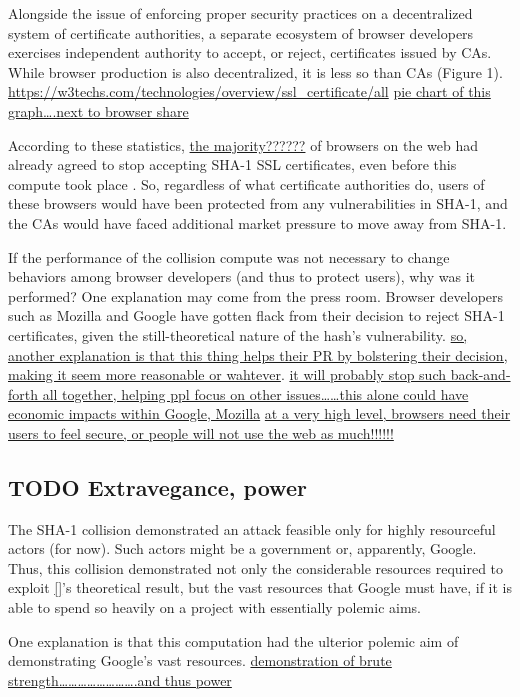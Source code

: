 \documentclass[sigconf]{acmart}
\begin{document}
Alongside the issue of enforcing proper security practices on a decentralized system of certificate authorities, 
a separate ecosystem of browser developers exercises independent authority to accept, or reject, certificates issued by CAs.
While browser production is also decentralized, it is less so than CAs (Figure 1).
\url{https://w3techs.com/technologies/overview/ssl\_certificate/all} \uline{pie chart of this graph\ldots{}.next to browser share}

According to these statistics, \uline{the majority??????} of browsers on the web had already agreed to stop accepting SHA-1 SSL certificates,
even before this compute took place
\cite{Sleevi2014,Mozilla2017}.
So, regardless of what certificate authorities do, users of these browsers would have been protected from any vulnerabilities in SHA-1, 
and the CAs would have faced additional market pressure to move away from SHA-1.

If the performance of the collision compute was not necessary to change behaviors among browser developers
(and thus to protect users),
why was it performed?
One explanation may come from the press room.
Browser developers such as Mozilla and Google have gotten flack from their decision to reject SHA-1 certificates,
given the still-theoretical nature of the hash's vulnerability.
\uline{so, another explanation is that this thing helps their PR by bolstering their decision, making it seem more reasonable or wahtever}.
\uline{it will probably stop such back-and-forth all together, helping ppl focus on other issues\ldots{}\ldots{}this alone could have economic impacts within Google, Mozilla}
\uline{at a very high level, browsers need their users to feel secure, or people will not use the web as much!!!!!!}

\subsection{{\bfseries\sffamily TODO} Extravegance, power}
\label{sec:org1027feb}

The SHA-1 collision demonstrated an attack feasible only for highly resourceful actors (for now). 
Such actors might be a government or, apparently, Google.
Thus, this collision demonstrated not only the considerable resources required to exploit \uline{[]}'s theoretical result,
but the vast resources that Google must have, if it is able to spend so heavily on a project with essentially polemic aims.

One explanation is that this computation had the ulterior polemic aim of demonstrating Google's vast resources.
\uline{demonstration of brute strength\ldots{}\ldots{}\ldots{}\ldots{}\ldots{}\ldots{}\ldots{}\ldots{}.and thus power}
\end{document}
